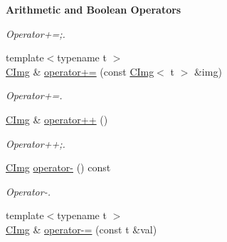 \begin{Indent}{\bf Arithmetic and Boolean Operators}
\begin{DoxyCompactItemize}
\begin{DoxyCompactList}\small\item\em Operator+=;. \item\end{DoxyCompactList}\item 
\hypertarget{structcimg__library_1_1_c_img_a80d0cb2baa4011d66092737ff5193805}{
{\footnotesize template$<$typename t $>$ }\\\hyperlink{structcimg__library_1_1_c_img}{CImg} \& \hyperlink{structcimg__library_1_1_c_img_a80d0cb2baa4011d66092737ff5193805}{operator+=} (const \hyperlink{structcimg__library_1_1_c_img}{CImg}$<$ t $>$ \&img)}
\label{structcimg__library_1_1_c_img_a80d0cb2baa4011d66092737ff5193805}

\begin{DoxyCompactList}\small\item\em Operator+=. \item\end{DoxyCompactList}\item 
\hypertarget{structcimg__library_1_1_c_img_a2f9edea59a865e87f700a1bee8ba0622}{
\hyperlink{structcimg__library_1_1_c_img}{CImg} \& \hyperlink{structcimg__library_1_1_c_img_a2f9edea59a865e87f700a1bee8ba0622}{operator++} ()}
\label{structcimg__library_1_1_c_img_a2f9edea59a865e87f700a1bee8ba0622}

\begin{DoxyCompactList}\small\item\em Operator++;. \item\end{DoxyCompactList}\item 
\hypertarget{structcimg__library_1_1_c_img_a2ed997930f52f369b422bedc6c56cc9c}{
\hyperlink{structcimg__library_1_1_c_img}{CImg} \hyperlink{structcimg__library_1_1_c_img_a2ed997930f52f369b422bedc6c56cc9c}{operator-\/} () const }
\label{structcimg__library_1_1_c_img_a2ed997930f52f369b422bedc6c56cc9c}

\begin{DoxyCompactList}\small\item\em Operator-\/. \item\end{DoxyCompactList}\item 
\hypertarget{structcimg__library_1_1_c_img_af38ca9949458261c2dcfec52cf355b36}{
{\footnotesize template$<$typename t $>$ }\\\hyperlink{structcimg__library_1_1_c_img}{CImg} \& \hyperlink{structcimg__library_1_1_c_img_af38ca9949458261c2dcfec52cf355b36}{operator-\/=} (const t \&val)}
\label{structcimg__library_1_1_c_img_af38ca9949458261c2dcfec52cf355b36}


\end{DoxyCompactItemize}
\end{Indent}
